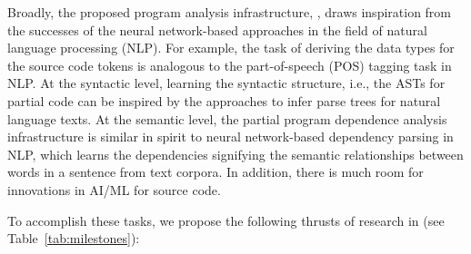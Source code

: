 
Broadly, the proposed program analysis infrastructure, \tool, draws inspiration from the successes of the neural network-based approaches in the field of natural language processing (NLP). For example, the task of deriving the data types for the source code tokens is analogous to the part-of-speech (POS) tagging task in NLP. At the syntactic level, learning the syntactic structure, i.e., the ASTs for partial code can be inspired by the approaches to infer parse trees for natural language texts. At the semantic level, the partial program dependence analysis infrastructure is similar in spirit to neural network-based dependency parsing in NLP, which learns the dependencies signifying the semantic relationships between words in a sentence from text corpora. In addition, there is much room for innovations in AI/ML for source code.


To accomplish these tasks, we propose the following thrusts of research in {\tool} (see Table~\ref{tab:milestones}):

\vspace{3pt}

